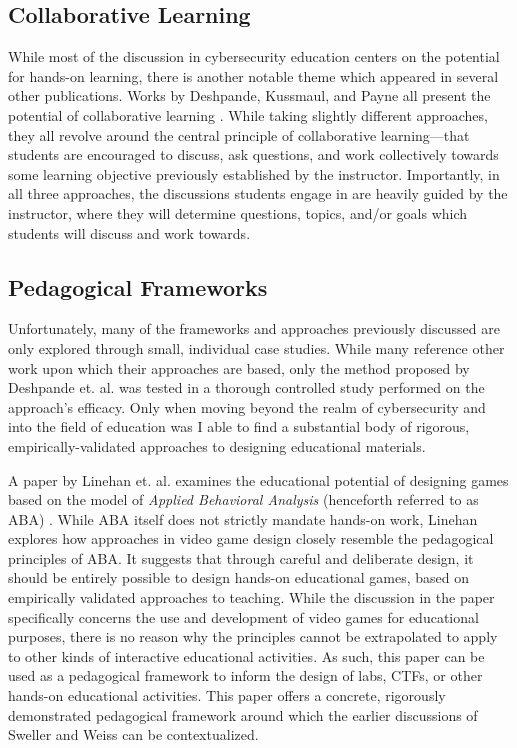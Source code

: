 \documentclass{article}
\begin{document}
\subsection{Collaborative Learning}

    While most of the discussion in cybersecurity education centers on the potential for hands-on learning, there is another notable theme which appeared in several other publications. Works by Deshpande, Kussmaul, and Payne all present the potential of collaborative learning \cite{P-Deshpande,C-Kussmaul,B-Payne}. While taking slightly different approaches, they all revolve around the central principle of collaborative learning---that students are encouraged to discuss, ask questions, and work collectively towards some learning objective previously established by the instructor. 
    Importantly, in all three approaches, the discussions students engage in are heavily guided by the instructor, where they will determine questions, topics, and/or goals which students will discuss and work towards. 

\subsection{Pedagogical Frameworks}

    Unfortunately, many of the frameworks and approaches previously discussed are only explored through small, individual case studies. While many reference other work upon which their approaches are based, only the method proposed by Deshpande et. al. was tested in a thorough controlled study performed on the approach’s efficacy. Only when moving beyond the realm of cybersecurity and into the field of education was I able to find a substantial body of rigorous, empirically-validated approaches to designing educational materials. 

    A paper by Linehan et. al. examines the educational potential of designing games based on the model of \emph{Applied Behavioral Analysis} (henceforth referred to as ABA) \cite{C-Linehan}. While ABA itself does not strictly mandate hands-on work, Linehan explores how approaches in video game design closely resemble the pedagogical principles of ABA. It suggests that through careful and deliberate design, it should be entirely possible to design hands-on educational games, based on empirically validated approaches to teaching. While the discussion in the paper specifically concerns the use and development of video games for educational purposes, there is no reason why the principles cannot be extrapolated to apply to other kinds of interactive educational activities. As such, this paper can be used as a pedagogical framework to inform the design of labs, CTFs, or other hands-on educational activities. This paper offers a concrete, rigorously demonstrated pedagogical framework around which the earlier discussions of Sweller and Weiss can be contextualized. 
\end{document}
